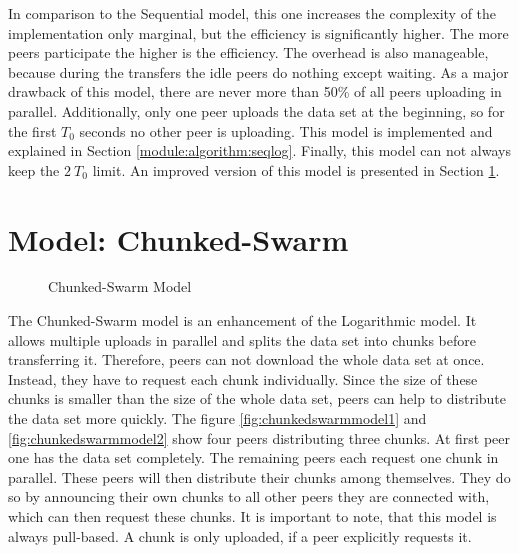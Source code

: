 In comparison to the Sequential model, this one increases the complexity of the implementation only marginal, but the efficiency is significantly higher. The more peers participate the higher is the efficiency. The overhead is also manageable, because during the transfers the idle peers do nothing except waiting. As a major drawback of this model, there are never more than 50\% of all peers uploading in parallel. Additionally, only one peer uploads the data set at the beginning, so for the first $T_0$ seconds no other peer is uploading. This model is implemented and explained in Section \ref{module:algorithm:seqlog}. Finally, this model can not always keep the $2\:T_0$ limit. An improved version of this model is presented in Section \ref{theory:model:chunkedswarm}.

\section{Model: Chunked-Swarm}
\label{theory:model:chunkedswarm}

\begin{figure}[ht]
	\begin{center}
	 	\hspace{0.25\textwidth}

		\caption{Chunked-Swarm Model}
	\end{center}
\end{figure}


The Chunked-Swarm model is an enhancement of the Logarithmic model. It allows multiple uploads in parallel and splits the data set into chunks before transferring it. Therefore, peers can not download the whole data set at once. Instead, they have to request each chunk individually. Since the size of these chunks is smaller than the size of the whole data set, peers can help to distribute the data set more quickly. The figure \ref{fig:chunkedswarmmodel1} and \ref{fig:chunkedswarmmodel2} show four peers distributing three chunks. At first peer one has the data set completely. The remaining peers each request one chunk in parallel. These peers will then distribute their chunks among themselves. They do so by announcing their own chunks to all other peers they are connected with, which can then request these chunks. It is important to note, that this model is always pull-based. A chunk is only uploaded, if a peer explicitly requests it.

